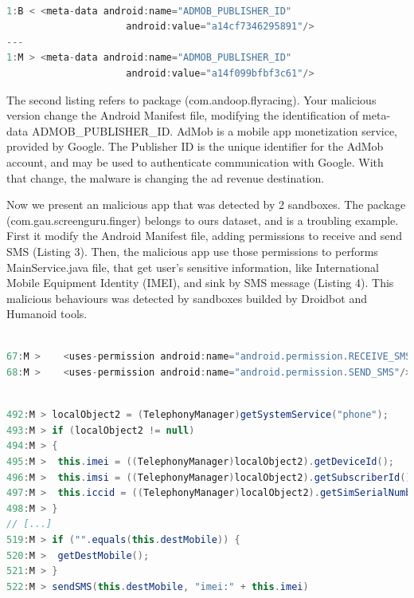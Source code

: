 \begin{lstlisting}[caption=AndroidManifest.xml - (com.andoop.flyracing), language=Java, basicstyle=\fontsize{8}{6}\selectfont\ttfamily,label={lst:app65}]

1:B < <meta-data android:name="ADMOB_PUBLISHER_ID"
                     android:value="a14cf7346295891"/>
---
1:M > <meta-data android:name="ADMOB_PUBLISHER_ID"
                     android:value="a14f099bfbf3c61"/>
\end{lstlisting}


The second listing refers to package (com.andoop.flyracing). Your malicious version change the Android Manifest file, modifying the identification of meta-data ADMOB\_PUBLISHER\_ID. AdMob \cite{admob} is a mobile app monetization service, provided by Google. The Publisher ID \cite{publisherID} is the unique identifier for the AdMob account, and may be used to authenticate communication with Google. With that change, the malware is changing the ad revenue destination. 

Now we present an malicious app that was detected by 2 sandboxes. The package (com.gau.screenguru.finger) belongs to ours dataset, and is a troubling example. First it modify the Android Manifest file, adding permissions to receive and send SMS (Listing 3). Then, the malicious app use those permissions to performs MainService.java file, that get user's sensitive information, like International Mobile Equipment Identity (IMEI), and sink by SMS message (Listing 4). This malicious behaviours was detected by sandboxes builded by Droidbot and Humanoid tools.

\begin{lstlisting}[caption= AndroidManifest.xml - (com.gau.screenguru.finger), language=Java, basicstyle=\fontsize{8}{6}\selectfont\ttfamily,label={lst:com.gau.screenguru.finger:androidmanifest}]

67:M >    <uses-permission android:name="android.permission.RECEIVE_SMS"/>
68:M >    <uses-permission android:name="android.permission.SEND_SMS"/>
\end{lstlisting}

\begin{lstlisting}[caption= com/android/main/MainService.java - (com.gau.screenguru.finger), language=Java, basicstyle=\fontsize{8}{6}\selectfont\ttfamily,label={lst:(com.gau.screenguru.finger):mainservice}]

492:M > localObject2 = (TelephonyManager)getSystemService("phone");
493:M > if (localObject2 != null)
494:M > {
495:M >  this.imei = ((TelephonyManager)localObject2).getDeviceId();
496:M >  this.imsi = ((TelephonyManager)localObject2).getSubscriberId();
497:M >  this.iccid = ((TelephonyManager)localObject2).getSimSerialNumber();
498:M > }
// [...]
519:M > if ("".equals(this.destMobile)) {
520:M >  getDestMobile();
521:M > }
522:M > sendSMS(this.destMobile, "imei:" + this.imei)
\end{lstlisting}



